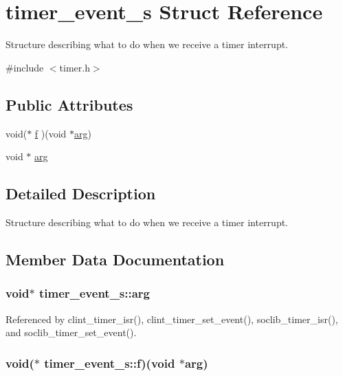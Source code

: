 \hypertarget{structtimer__event__s}{\section{timer\-\_\-event\-\_\-s Struct Reference}
\label{structtimer__event__s}
}


Structure describing what to do when we receive a timer interrupt.  




{\ttfamily \#include $<$timer.\-h$>$}

\subsection*{Public Attributes}
\begin{DoxyCompactItemize}
\item 
void($\ast$ \hyperlink{structtimer__event__s_a894a5ffd0c1b40b31fd3b124f22a9ffa}{f} )(void $\ast$\hyperlink{structtimer__event__s_a0c8f6673a1d1e2ae4a8598f72a8e7576}{arg})
\item 
void $\ast$ \hyperlink{structtimer__event__s_a0c8f6673a1d1e2ae4a8598f72a8e7576}{arg}
\end{DoxyCompactItemize}


\subsection{Detailed Description}
Structure describing what to do when we receive a timer interrupt. 

\subsection{Member Data Documentation}
\hypertarget{structtimer__event__s_a0c8f6673a1d1e2ae4a8598f72a8e7576}{
\subsubsection[{arg}]{\setlength{\rightskip}{0pt plus 5cm}void$\ast$ timer\-\_\-event\-\_\-s\-::arg}}\label{structtimer__event__s_a0c8f6673a1d1e2ae4a8598f72a8e7576}


Referenced by clint\-\_\-timer\-\_\-isr(), clint\-\_\-timer\-\_\-set\-\_\-event(), soclib\-\_\-timer\-\_\-isr(), and soclib\-\_\-timer\-\_\-set\-\_\-event().

\hypertarget{structtimer__event__s_a894a5ffd0c1b40b31fd3b124f22a9ffa}{
\subsubsection[{f}]{\setlength{\rightskip}{0pt plus 5cm}void($\ast$ timer\-\_\-event\-\_\-s\-::f)(void $\ast${\bf arg})}}\label{structtimer__event__s_a894a5ffd0c1b40b31fd3b124f22a9ffa}


